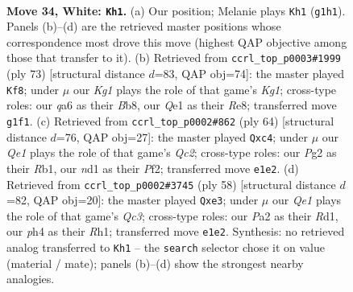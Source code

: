 \documentclass[11pt]{article}
\begin{document}
\clearpage

\begin{figure}[p]\centering
\begin{subfigure}{0.46\textwidth}\centering
\resizebox{\linewidth}{!}{%
\newchessgame
\chessboard[
  setfen={r5k1/1p3pb1/q5p1/p2pB3/7p/7P/P3nPP1/RN1nQ1K1 w - - 4 34},
  showmover=false,
  pgfstyle=straightmove, color=movearrow, markmove={g1-h1}
]}
\caption{}
\end{subfigure}\hfill
\begin{subfigure}{0.46\textwidth}\centering
\resizebox{\linewidth}{!}{%
\newchessgame
\chessboard[
  setfen={1b2r1k1/1p3p2/p1q2Npn/8/2PQ4/P7/1P4PP/3R3K b - - 1 37},
  showmover=false,
  pgfstyle=straightmove, color=movearrow, markmove={g8-f8}
]}
\caption{}
\end{subfigure}
\\[4pt]
\begin{subfigure}{0.46\textwidth}\centering
\resizebox{\linewidth}{!}{%
\newchessgame
\chessboard[
  setfen={3r2k1/4bp2/3q2pp/p1n5/P1n5/B5PP/2Q2PB1/1R4K1 w - - 0 33},
  showmover=false,
  pgfstyle=straightmove, color=movearrow, markmove={c2-c4}
]}
\caption{}
\end{subfigure}\hfill
\begin{subfigure}{0.46\textwidth}\centering
\resizebox{\linewidth}{!}{%
\newchessgame
\chessboard[
  setfen={1r5k/p1q3p1/2P1B2p/n3p3/8/2Q1pPb1/P5P1/K2R3R w - - 1 30},
  showmover=false,
  pgfstyle=straightmove, color=movearrow, markmove={c3-e3}
]}
\caption{}
\end{subfigure}
\caption{\textbf{Move 34, White: \texttt{Kh1}.} (a) Our position; Melanie plays \texttt{Kh1} (\texttt{g1h1}). Panels (b)--(d) are the retrieved master positions whose correspondence most drove this move (highest QAP objective among those that transfer to it). (b) Retrieved from \texttt{ccrl\_top\_p0003\#1999} (ply 73) [structural distance $d$=83, QAP obj=74]: the master played \texttt{Kf8}; under $\mu$ our \emph{Kg1} plays the role of that game's \emph{Kg1}; cross-type roles: our \emph{q}a6 as their \emph{B}b8, our \emph{Q}e1 as their \emph{R}e8; transferred move \texttt{g1f1}. (c) Retrieved from \texttt{ccrl\_top\_p0002\#862} (ply 64) [structural distance $d$=76, QAP obj=27]: the master played \texttt{Qxc4}; under $\mu$ our \emph{Qe1} plays the role of that game's \emph{Qc2}; cross-type roles: our \emph{P}g2 as their \emph{R}b1, our \emph{n}d1 as their \emph{P}f2; transferred move \texttt{e1e2}. (d) Retrieved from \texttt{ccrl\_top\_p0002\#3745} (ply 58) [structural distance $d$=82, QAP obj=20]: the master played \texttt{Qxe3}; under $\mu$ our \emph{Qe1} plays the role of that game's \emph{Qc3}; cross-type roles: our \emph{P}a2 as their \emph{R}d1, our \emph{p}h4 as their \emph{R}h1; transferred move \texttt{e1e2}. Synthesis: no retrieved analog transferred to \texttt{Kh1} -- the \texttt{search} selector chose it on value (material / mate); panels (b)--(d) show the strongest nearby analogies.}
\label{fig:thought-m66}
\end{figure}
\end{document}
